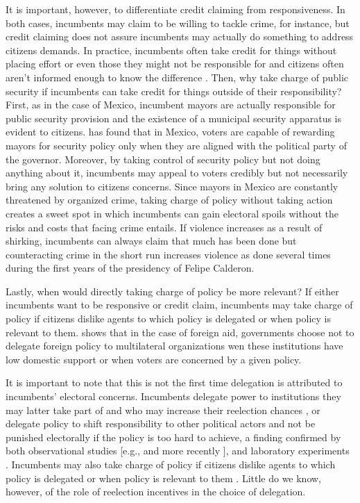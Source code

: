\documentclass[12pt]{amsart}
\numberwithin{equation}{section}
\theoremstyle{definition}
\theoremstyle{definition}
\theoremstyle{definition}
\begin{document}
It is important, however, to differentiate  credit claiming from responsiveness. %
In both cases, incumbents may claim to be willing to tackle crime, for instance, but credit claiming does not assure incumbents may actually do something to address citizens demands. In practice, incumbents often take credit for things without placing effort or even those they might not be responsible for and citizens often aren't informed enough to know the difference \citep{benedictis_kessner_2020}. Then, why take charge of public security if incumbents can take credit for things outside of their responsibility? First, as in the case of Mexico, incumbent mayors are actually responsible for public security provision and the existence of a municipal security apparatus is evident to citizens. \citet{ley_2017} has found that in Mexico, voters are capable of rewarding mayors for security policy only when they are aligned with the political party of the governor. Moreover, by taking control of security policy but not doing anything about it, incumbents may appeal to voters credibly but not necessarily bring any solution to citizens concerns. Since mayors in Mexico are constantly threatened by organized crime, taking charge of policy without taking action creates a sweet spot in which incumbents can gain electoral spoils without the risks and costs that facing crime entails. If violence increases as a result of shirking, incumbents can always claim that much has been done but counteracting crime in the short run increases violence as done several times during the first years of the presidency of Felipe Calderon. 

Lastly, when would directly taking charge of policy be more relevant? If either incumbents want to be responsive or credit claim, incumbents may take charge of policy if citizens dislike agents to which policy is delegated or when policy is relevant to them. \citet{milner_2004} shows that in the case of foreign aid, governments choose not to delegate foreign policy to multilateral organizations wen these institutions have low domestic support or when voters are concerned by a given policy.  

It is important to note that this is not the first time delegation is attributed to incumbents' electoral concerns. Incumbents delegate power to institutions they may latter take part of and who may increase their reelection chances \citep{mccubbins_1991}, or delegate policy to shift responsibility to other political actors and not be punished electorally if the policy is too hard to achieve, a finding confirmed by both observational studies [e.g., \citet{fiorina_1982} and more recently \citep{loftis_2014}],  and laboratory experiments \citep{bartling_fischbacher_2012}. Incumbents may also take charge of policy if citizens dislike agents to which policy is delegated or when policy is relevant to them \citep{milner_2004}. Little do we know, however, of the role of reelection incentives in the choice of delegation. 
\end{document}
